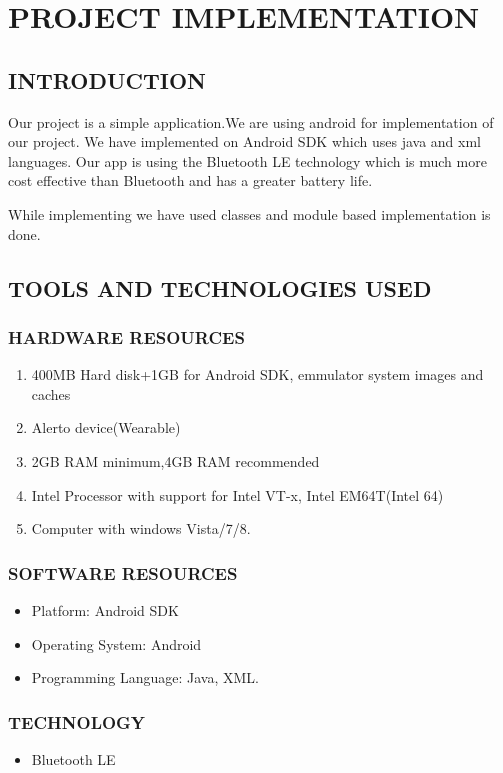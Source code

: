 \documentclass[12pt,a4paper]{report}
\begin{document}
\chapter{PROJECT IMPLEMENTATION}
\newpage

\section{INTRODUCTION}
Our project is a simple application.We are using android for implementation of our project. We have implemented on Android SDK which uses java and xml languages. Our app is using the Bluetooth LE technology which is much more cost effective than Bluetooth and has a greater battery life.

While implementing we have used classes and module based implementation is done. 

\section{TOOLS AND TECHNOLOGIES USED}
\subsection{HARDWARE RESOURCES }
\begin{enumerate}
	\item	400MB Hard disk+1GB for Android SDK, emmulator system images and caches
	\item	Alerto device(Wearable)
	\item	2GB RAM minimum,4GB RAM recommended
	\item	Intel Processor with support for Intel VT-x, Intel EM64T(Intel 64)
	\item	Computer  with windows Vista/7/8.
	
\end{enumerate}

\subsection{SOFTWARE RESOURCES }

\begin{itemize}
	\item Platform: Android SDK
	\item  Operating System: Android
	\item  Programming Language: Java, XML.
\end{itemize}

\subsection{TECHNOLOGY}
\begin{itemize}
	\item Bluetooth LE
\end{itemize}
\end{document}
